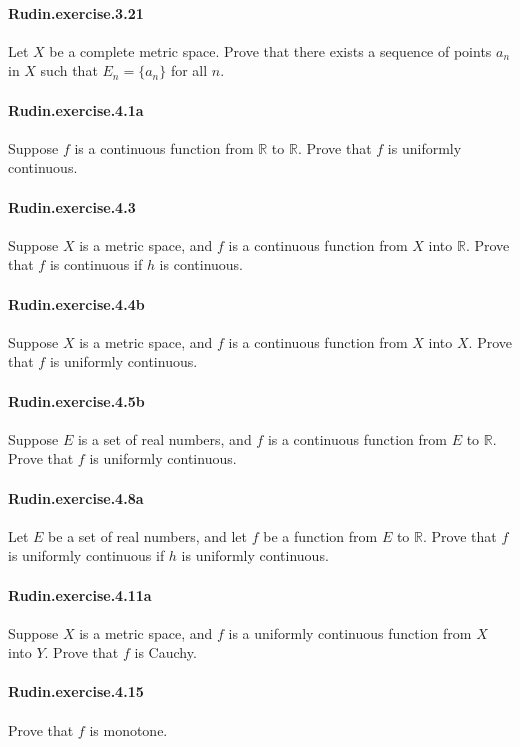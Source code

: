 \documentclass{article}
\begin{document}
\paragraph{Rudin.exercise.3.21} Let $X$ be a complete metric space. Prove that there exists a sequence of points $a_n$ in $X$ such that $E_n = \{a_n\}$ for all $n$.

\paragraph{Rudin.exercise.4.1a} Suppose $f$ is a continuous function from $\mathbb{R}$ to $\mathbb{R}$. Prove that $f$ is uniformly continuous.

\paragraph{Rudin.exercise.4.3} Suppose $X$ is a metric space, and $f$ is a continuous function from $X$ into $\mathbb{R}$. Prove that $f$ is continuous if $h$ is continuous.

\paragraph{Rudin.exercise.4.4b} Suppose $X$ is a metric space, and $f$ is a continuous function from $X$ into $X$. Prove that $f$ is uniformly continuous.

\paragraph{Rudin.exercise.4.5b} Suppose $E$ is a set of real numbers, and $f$ is a continuous function from $E$ to $\mathbb{R}$. Prove that $f$ is uniformly continuous.

\paragraph{Rudin.exercise.4.8a} Let $E$ be a set of real numbers, and let $f$ be a function from $E$ to $\mathbb{R}$. Prove that $f$ is uniformly continuous if $h$ is uniformly continuous.

\paragraph{Rudin.exercise.4.11a} Suppose $X$ is a metric space, and $f$ is a uniformly continuous function from $X$ into $Y$. Prove that $f$ is Cauchy.

\paragraph{Rudin.exercise.4.15} Prove that $f$ is monotone.
\end{document}
